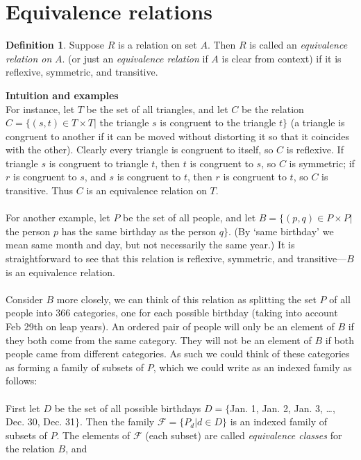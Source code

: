 \documentclass{report}
\theoremstyle{definition}
\newtheorem*{definition}{Definition}
\begin{document}
\section{Equivalence relations}
\begin{definition}
Suppose $R$ is a relation on set $A$. Then $R$ is called an \textit{equivalence relation on} $A$.
(or just an \textit{equivalence relation} if $A$ is clear from context) if it is reflexive, symmetric, and transitive.
\end{definition}
\noindent\textbf{Intuition and examples}\\
For instance, let $T$ be the set of all triangles, and let $C$ be the relation $C=\{(s,t)\in T\times T|$ the triangle $s$ is congruent to the triangle $t\}$ (a triangle is congruent
to another if it can be moved without distorting it so that it coincides with the other). Clearly every triangle is congruent to itself, so $C$ is reflexive. If triangle $s$ is congruent to 
triangle $t$, then $t$ is congruent to $s$, so $C$ is symmetric; if $r$ is congruent to $s$, and $s$ is congruent to $t$, then $r$ is congruent to $t$, so $C$ is transitive. 
Thus $C$ is an equivalence relation on $T$.\\
\vspace{1mm}\\
For another example, let $P$ be the set of all people, and let $B=\{(p,q)\in P\times P|$ the person $p$ has the same birthday as the person $q\}$. (By `same birthday' we mean same month and day,
but not necessarily the same year.) It is straightforward to see that this relation is reflexive, symmetric, and transitive---$B$ is an equivalence relation.\\
\vspace{1mm}\\
Consider $B$ more closely, we can think of this relation as splitting the set $P$ of all people into 366 categories, one for each possible birthday (taking into account Feb 29th on leap years).
An ordered pair of people will only be an element of $B$ if they both come from the same category.
They will not be an element of $B$ if both people came from different categories. As such we could think of these categories as forming a family of subsets of $P$, 
which we could write as an indexed family as follows:\\
\vspace{1mm}\\
First let $D$ be the set of all possible birthdays $D=\{$Jan. 1, Jan. 2, Jan. 3, \ldots, Dec. 30, Dec. 31$\}$. 
Then the family $\mathcal F=\{P_d|d\in D\}$ is an indexed family of subsets of $P$. The elements of $\mathcal F$ (each subset) are called \textit{equivalence classes} for the relation $B$, and 
\end{document}

